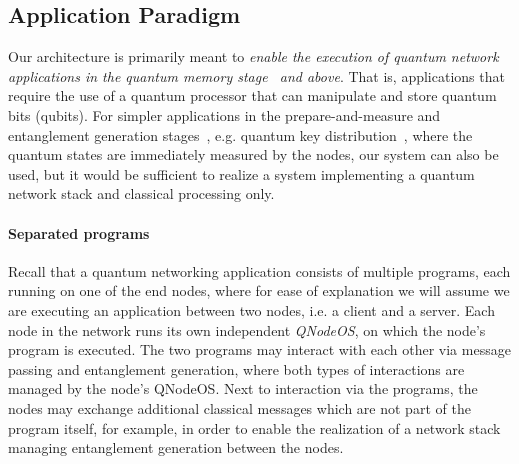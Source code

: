 \begin{figure}[h]
    \label{qnodeos:fig:network_nodes}
\end{figure}

\subsection{Application Paradigm}
\label{qnodeos:sec:design-consid:challenges:application}

Our architecture is primarily meant to \emph{enable the execution of quantum network applications in the quantum memory stage~\cite{wehner_2018_stages} and above}. That is, applications that require the use of a quantum processor that can manipulate and store quantum bits (qubits). For simpler applications in the prepare-and-measure and entanglement generation stages~\cite{wehner_2018_stages}, e.g. quantum key distribution~\cite{bb84Original,ekert_1991_e91}, where the quantum states are immediately measured by the nodes, our system can also be used, but it would be sufficient to realize a system implementing a quantum network stack and classical processing only.

\paragraph{Separated programs}

Recall that a quantum networking application consists of multiple programs, each running on one of the end nodes, where for ease of explanation we will assume we are executing an application between two nodes, i.e. a client and a server. Each node in the network runs its own independent \emph{\ac{QNodeOS}}, on which the node's program is executed. The two programs may interact with each other via message passing and entanglement generation, where both types of interactions are managed by the node's \ac{QNodeOS}. Next to interaction via the programs, the nodes may exchange additional classical messages which are not part of the program itself, for example, in order to enable the realization of a network stack~\cite{dahlberg_2019_egp} managing entanglement generation between the nodes.

